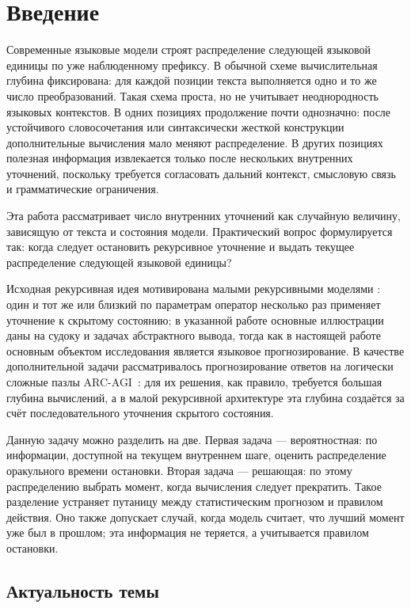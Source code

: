 \section{Введение}

Современные языковые модели строят распределение следующей языковой единицы по уже наблюденному
префиксу. В обычной схеме вычислительная глубина фиксирована: для каждой позиции текста
выполняется одно и то же число преобразований. Такая схема проста, но не учитывает неоднородность
языковых контекстов. В одних позициях продолжение почти однозначно: после устойчивого
словосочетания или синтаксически жесткой конструкции дополнительные вычисления мало меняют
распределение. В других позициях полезная информация извлекается только после нескольких
внутренних уточнений, поскольку требуется согласовать дальний контекст, смысловую связь и
грамматические ограничения.

Эта работа рассматривает число внутренних уточнений как случайную величину, зависящую от текста и
состояния модели. Практический вопрос формулируется так: когда следует остановить рекурсивное
уточнение и выдать текущее распределение следующей языковой единицы? 

Исходная рекурсивная идея мотивирована малыми рекурсивными моделями \cite{trm}: один и тот же или
близкий по параметрам оператор несколько раз применяет уточнение к скрытому состоянию; в указанной
работе основные иллюстрации даны на судоку и задачах абстрактного вывода, тогда как в настоящей
работе основным объектом исследования является языковое прогнозирование. В качестве дополнительной
задачи рассматривалось прогнозирование ответов на логически сложные пазлы ARC-AGI~\cite{arcagi}:
для их решения, как правило, требуется большая глубина вычислений, а в малой рекурсивной
архитектуре эта глубина создаётся за счёт последовательного уточнения скрытого состояния.

Данную задачу можно разделить на две. Первая задача --- вероятностная: по информации, доступной на
текущем внутреннем шаге, оценить распределение оракульного времени остановки. Вторая задача ---
решающая: по этому распределению выбрать момент, когда вычисления следует прекратить. Такое
разделение устраняет путаницу между статистическим прогнозом и правилом действия. Оно также
допускает случай, когда модель считает, что лучший момент уже был в прошлом; эта информация не
теряется, а учитывается правилом остановки.

\subsection{Актуальность темы}

